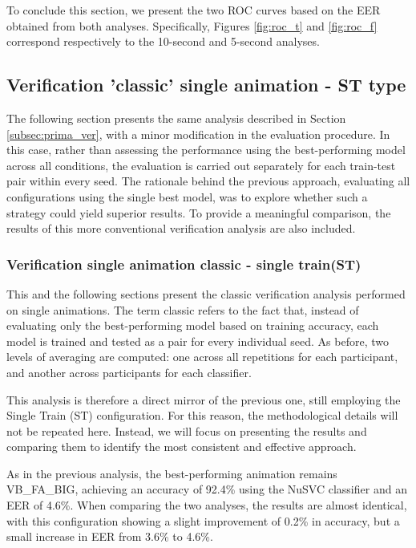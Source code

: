 \documentclass{article}
\begin{document}
To conclude this section, we present the two ROC curves based on the EER obtained from both analyses.
Specifically, Figures \ref{fig:roc_t} and \ref{fig:roc_f} correspond respectively to the 10-second and 5-second analyses.
\FloatBarrier

\subsection{Verification 'classic' single animation - ST type}

The following section presents the same analysis described in Section \ref{subsec:prima_ver}, with a minor modification in the evaluation procedure.
In this case, rather than assessing the performance using the best-performing model across all conditions, the evaluation is carried out separately for each train-test pair within every seed.
The rationale behind the previous approach, evaluating all configurations using the single best model, was to explore whether such a strategy could yield superior results.
To provide a meaningful comparison, the results of this more conventional verification analysis are also included.

\subsubsection{Verification single animation classic - single train(ST)}
\label{subsec:s_vs_cst}

This and the following sections present the classic verification analysis performed on single animations.
The term classic refers to the fact that, instead of evaluating only the best-performing model based on training accuracy, each model is trained and tested as a pair for every individual seed.
As before, two levels of averaging are computed: one across all repetitions for each participant, and another across participants for each classifier.

This analysis is therefore a direct mirror of the previous one, still employing the Single Train (ST) configuration.
For this reason, the methodological details will not be repeated here.
Instead, we will focus on presenting the results and comparing them to identify the most consistent and effective approach.

As in the previous analysis, the best-performing animation remains VB\_FA\_BIG, achieving an accuracy of 92.4\% using the NuSVC classifier and an EER of 4.6\%.
When comparing the two analyses, the results are almost identical, with this configuration showing a slight improvement of 0.2\% in accuracy, but a small increase in EER from 3.6\% to 4.6\%.
\end{document}
